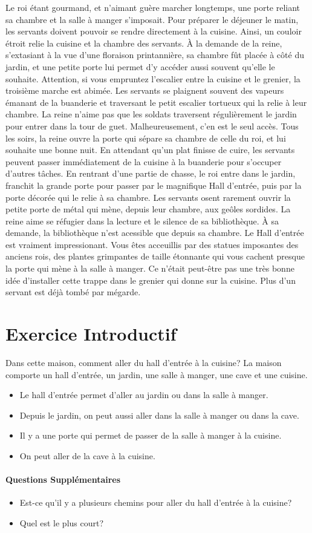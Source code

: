 \documentclass{article}
\begin{document}
Le roi étant gourmand, et n'aimant guère marcher longtemps, une porte reliant sa chambre et la salle à manger s'imposait.
Pour préparer le déjeuner le matin, les servants doivent pouvoir se rendre directement à la cuisine. Ainsi, un couloir étroit relie la cuisine et la chambre des servants.
À la demande de la reine, s'extasiant à la vue d'une floraison printannière, sa chambre fût placée à côté du jardin, et une petite porte lui permet d'y accéder aussi souvent qu'elle le souhaite.
Attention, si vous empruntez l'escalier entre la cuisine et le grenier, la troisième marche est abimée.
Les servants se plaignent souvent des vapeurs émanant de la buanderie et traversant le petit escalier tortueux qui la relie à leur chambre.
La reine n'aime pas que les soldats traversent régulièrement le jardin pour entrer dans la tour de guet. Malheureusement, c'en est le seul accès.
Tous les soirs, la reine ouvre la porte qui sépare sa chambre de celle du roi, et lui souhaite une bonne nuit.
En attendant qu'un plat finisse de cuire, les servants peuvent passer immédiatement de la cuisine à la buanderie pour s'occuper d'autres tâches.
En rentrant d'une partie de chasse, le roi entre dans le jardin, franchit la grande porte pour passer par le magnifique Hall d'entrée, puis par la porte décorée qui le relie à sa chambre.
Les servants osent rarement ouvrir la petite porte de métal qui mène, depuis leur chambre, aux geôles sordides.
La reine aime se réfugier dans la lecture et le silence de sa bibliothèque. À sa demande, la bibliothèque n'est acessible que depuis sa chambre.
Le Hall d'entrée est vraiment impressionant. Vous êtes acceuillis par des statues imposantes des anciens rois, des plantes grimpantes de taille étonnante qui vous cachent presque la porte qui mène à la salle à manger.
Ce n'était peut-être pas une très bonne idée d'installer cette trappe dans le grenier qui donne sur la cuisine. Plus d'un servant est déjà tombé par mégarde.

\newpage
\section{Exercice Introductif}
Dans cette maison, comment aller du hall d'entrée à la cuisine?
La maison comporte un hall d'entrée, un jardin, une salle à manger, une cave et une cuisine.

\begin{itemize}
\item Le hall d'entrée permet d'aller au jardin ou dans la salle à manger.
\item Depuis le jardin, on peut aussi aller dans la salle à manger ou dans la cave.
\item Il y a une porte qui permet de passer de la salle à manger à la cuisine.
\item On peut aller de la cave à la cuisine.
\end{itemize}


\paragraph{Questions Supplémentaires}
\begin{itemize}
\item Est-ce qu'il y a plusieurs chemins pour aller du hall d'entrée à la cuisine?
\item Quel est le plus court?
\end{itemize}
\end{document}
